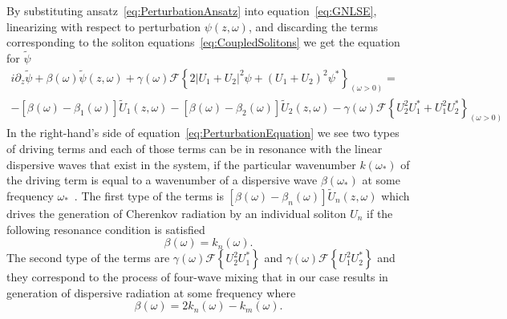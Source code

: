 \documentclass[aps, prl, twocolumn, superscriptaddress, final]{revtex4}
\newcommand{\abs}[1]{\left| #1 \right|}
\begin{document}
\begin{widetext}
By substituting ansatz~\eqref{eq:PerturbationAnsatz} into equation~\eqref{eq:GNLSE}, linearizing with respect to perturbation $\psi(z, \omega)$, and discarding the terms corresponding to the soliton equations~\eqref{eq:CoupledSolitons} we get the equation for $\tilde \psi$
\begin{multline}
  \label{eq:PerturbationEquation}
  i \partial_{z} \tilde \psi
    + \beta(\omega) \tilde \psi(z, \omega)
    + \gamma(\omega) \mathcal{F}\left\{
      2 \abs{U_{1} + U_{2}}^{2} \psi +
      \left( U_{1} + U_{2} \right)^{2} \psi^{*}
    \right\}_{(\omega > 0)} = \\
    - \left[ \beta(\omega) - \beta_{1}(\omega) \right] \tilde U_{1}(z, \omega)
    - \left[ \beta(\omega) - \beta_{2}(\omega) \right] \tilde U_{2}(z, \omega)
    - \gamma(\omega) \mathcal{F} \left\{
      U_{2}^{2} U_{1}^{*} + U_{1}^{2} U_{2}^{*}
    \right\}_{(\omega > 0)}
\end{multline}
In the right-hand's side of equation~\eqref{eq:PerturbationEquation} we see two types of driving terms and each of those terms can be in resonance with the linear dispersive waves that exist in the system, if the particular wavenumber $k(\omega_{*})$ of the driving term is equal to a wavenumber of a dispersive wave $\beta(\omega_{*})$ at some frequency $\omega_{*}$~\cite{akhmediev1995cherenkov, yulin2004four}. The first type of the terms is $\left[ \beta(\omega) - \beta_{n}(\omega) \right] \tilde U_{n}(z, \omega)$ which drives the generation of Cherenkov radiation by an individual soliton $U_{n}$ if the following resonance condition is satisfied
\begin{equation}
  \label{eq:CherenkovRadiationResonanceCondition}
  \beta(\omega) = k_{n}(\omega).
\end{equation}
The second type of the terms are $\gamma(\omega) \mathcal{F}\left\{ U_{2}^{2} U_{1}^{*} \right\}$ and $\gamma(\omega) \mathcal{F}\left\{ U_{1}^{2} U_{2}^{*} \right\}$ and they correspond to the process of four-wave mixing that in our case results in generation of dispersive radiation at some frequency where
\begin{equation}
  \label{eq:FWMRadiationResonanceCondition}
  \beta(\omega) = 2 k_{n}(\omega)  - k_{m}(\omega).
\end{equation}


\end{widetext}
\end{document}
